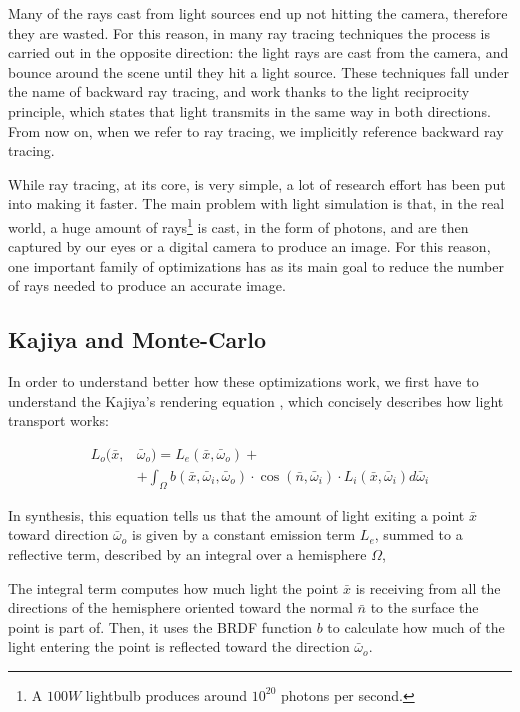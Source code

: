 \documentclass[11pt,a4paper,twocolumn]{article}
\begin{document}
Many of the rays cast from light sources end up not hitting the camera, therefore they are wasted. For this reason, in many ray tracing techniques the process is carried out in the opposite direction: the light rays are cast from the camera, and bounce around the scene until they hit a light source. These techniques fall under the name of backward ray tracing, and work thanks to the light reciprocity principle, which states that light transmits in the same way in both directions. From now on, when we refer to ray tracing, we implicitly reference backward ray tracing.

While ray tracing, at its core, is very simple, a lot of research effort has been put into making it faster. The main problem with light simulation is that, in the real world, a huge amount of rays\footnote{A $100W$ lightbulb produces around $10^{20}$ photons per second.} is cast, in the form of photons, and are then captured by our eyes or a digital camera to produce an image. For this reason, one important family of optimizations has as its main goal to reduce the number of rays needed to produce an accurate image.

\subsection{Kajiya and Monte-Carlo}
In order to understand better how these optimizations work, we first have to understand the Kajiya's rendering equation \cite{rendering_equation}, which concisely describes how light transport works:

\begin{subequations}
    \begin{align*}
        L_o(\bar{x},&\bar{\omega}_o) = L_e(\bar{x}, \bar{\omega}_o) +\\
        &+\int_\Omega b(\bar{x}, \bar{\omega}_i, \bar{\omega}_o) \cdot \cos(\bar{n}, \bar{\omega}_i) \cdot L_i(\bar{x}, \bar{\omega}_i) d\bar{\omega}_i
    \end{align*}
\end{subequations}

In synthesis, this equation tells us that the amount of light exiting a point $\bar{x}$ toward direction $\bar{\omega}_o$ is given by a constant emission term $L_e$, summed to a reflective term, described by an integral over a hemisphere $\Omega$,

The integral term computes how much light the point $\bar{x}$ is receiving from all the directions of the hemisphere oriented toward the normal $\bar{n}$ to the surface the point is part of. Then, it uses the BRDF function $b$ to calculate how much of the light entering the point is reflected toward the direction $\bar{\omega}_o$.
\end{document}
